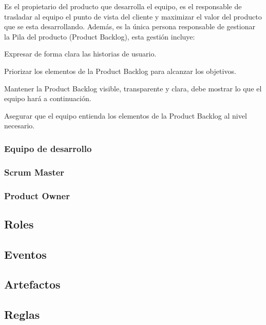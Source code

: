 Es el propietario del producto que desarrolla el equipo, es el responsable de trasladar al equipo el punto de vista del cliente y maximizar
el valor del producto que se esta desarrollando. Además, es la única persona responsable de gestionar la Pila del producto (Product Backlog), 
esta gestión incluye:

\begin{itemsize}
	\item Expresar de forma clara las historias de usuario.
	\item Priorizar los elementos de la Product Backlog para alcanzar los objetivos.
	\item Mantener la Product Backlog visible, transparente y clara, debe mostrar lo que el equipo hará a continuación.
	\item Asegurar que el equipo entienda los elementos de la Product Backlog al nivel necesario.
\end{itemsize}

\subsubsection{Equipo de desarrollo}



\subsubsection{Scrum Master}

\subsubsection{Product Owner}


\subsection{Roles}

\subsection{Eventos}

\subsection{Artefactos}

\subsection{Reglas}

